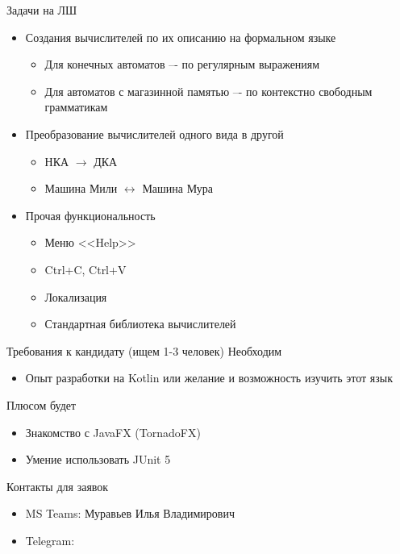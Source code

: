 \documentclass[xetex,mathserif,serif]{beamer}
\begin{document}
        \begin{frame}{Задачи на ЛШ}
            \begin{itemize}
                \item Создания вычислителей по их описанию на формальном языке
                \begin{itemize}
                    \item Для конечных автоматов –- по регулярным выражениям
                    \item Для автоматов с магазинной памятью –- по контекстно свободным грамматикам
                \end{itemize}
                \item Преобразование вычислителей одного вида в другой
                \begin{itemize}
                    \item НКА $\longrightarrow$ ДКА
                    \item Машина Мили $\longleftrightarrow$ Машина Мура
                \end{itemize}
                \item Прочая функциональность
                    \begin{itemize}
                        \item Меню <<Help>>
                        \item Ctrl+C, Ctrl+V
                        \item Локализация
                        \item Стандартная библиотека вычислителей
                    \end{itemize}
            \end{itemize}
        \end{frame}
        
        \begin{frame}{Требования к кандидату (ищем 1-3 человек)}
            Необходим
            \begin{itemize}
                \item Опыт разработки на Kotlin или желание и возможность изучить этот язык
            \end{itemize}
            \vspace{10pt}
            Плюсом будет
            \begin{itemize}
                \item Знакомство с JavaFX (TornadoFX)
                \item Умение использовать JUnit 5
            \end{itemize}
        \end{frame}
        
        \begin{frame}{Контакты для заявок}
            \begin{itemize}
                \item MS Teams: Муравьев Илья Владимирович
                \item Telegram: \href{https://t.me/ilyamuravjov}{\color{blue}{@ilyamuravjov}}
            \end{itemize}
        \end{frame}
\end{document}
